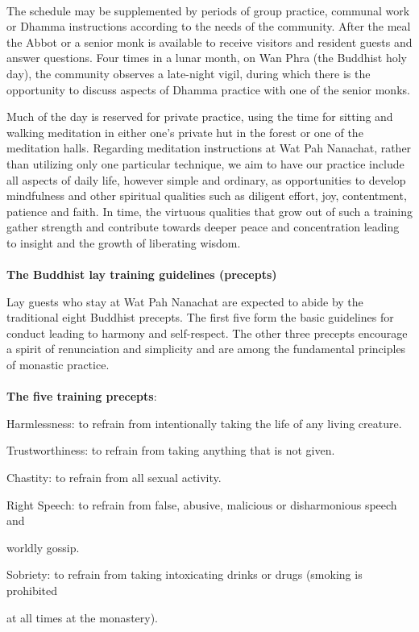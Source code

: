 \\The schedule may be supplemented by periods of group practice,
communal work or Dhamma instructions according to the needs of the
community. After the meal the Abbot or a senior monk is available to
receive visitors and resident guests and answer questions. Four times in
a lunar month, on Wan Phra (the Buddhist holy day), the community
observes a late-night vigil, during which there is the opportunity to
discuss aspects of Dhamma practice with one of the senior monks.

Much of the day is reserved for private practice, using the time for
sitting and walking meditation in either one's private hut in the forest
or one of the meditation halls. Regarding meditation instructions at Wat
Pah Nanachat, rather than utilizing only one particular technique, we
aim to have our practice include all aspects of daily life, however
simple and ordinary, as opportunities to develop mindfulness and other
spiritual qualities such as diligent effort, joy, contentment, patience
and faith. In time, the virtuous qualities that grow out of such a
training gather strength and contribute towards deeper peace and
concentration leading to insight and the growth of liberating
wisdom.\\\\\textbf{The Buddhist lay training guidelines (precepts)}

Lay guests who stay at Wat Pah Nanachat are expected to abide by the
traditional eight Buddhist precepts. The first five form the basic
guidelines for conduct leading to harmony and self-respect. The other
three precepts encourage a spirit of renunciation and simplicity and are
among the fundamental principles of monastic practice.\\\\\textbf{The
five training precepts}:

Harmlessness: to refrain from intentionally taking the life of any
living creature.

Trustworthiness: to refrain from taking anything that is not given.

Chastity: to refrain from all sexual activity.

Right Speech: to refrain from false, abusive, malicious or disharmonious
speech and

worldly gossip.

Sobriety: to refrain from taking intoxicating drinks or drugs (smoking
is prohibited

at all times at the monastery).

